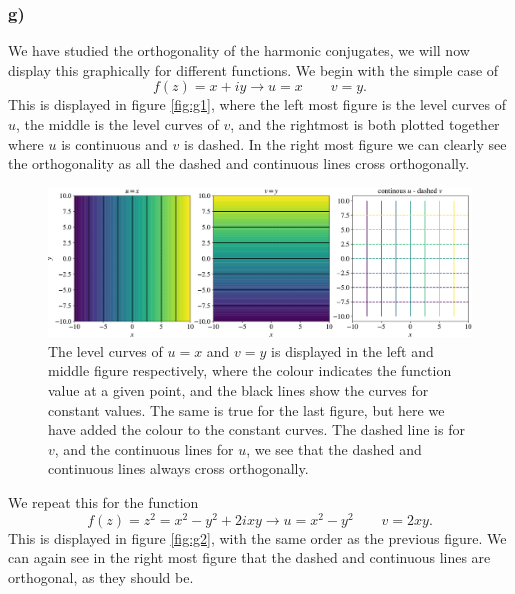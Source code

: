 \documentclass[12pt,twoside]{article}
\begin{document}
\subsubsection*{g)}
We have studied the orthogonality of the harmonic conjugates, we will now display this graphically for different functions. We begin with the simple case of
\begin{equation}
  f(z) = x+iy \rightarrow u=x\qquad v=y.
\end{equation}
This is displayed in figure \vref{fig:g1}, where the left most figure is the level curves of $u$, the middle is the level curves of $v$, and the rightmost is both plotted together where $u$ is continuous and $v$ is dashed. In the right most figure we can clearly see the orthogonality as all the dashed and continuous lines cross orthogonally. \par
\begin{figure}
  \centering
  \includegraphics[width=\textwidth]{../figures/first.pdf}
  \caption{The level curves of $u=x$ and $v=y$ is displayed in the left and middle figure respectively, where the colour indicates the function value at a given point, and the black lines show the curves for constant values. The same is true for the last figure, but here we have added the colour to the constant curves. The dashed line is for $v$, and the continuous lines for $u$, we see that the dashed and continuous lines always cross orthogonally.}
  \label{fig:g1}
\end{figure}
We repeat this for the function
\begin{equation}
  f(z) = z^2 = x^2-y^2+2ixy \rightarrow u=x^2-y^2\qquad v=2xy.
\end{equation}
This is displayed in figure \vref{fig:g2}, with the same order as the previous figure. We can again see in the right most figure that the dashed and continuous lines are orthogonal, as they should be.\par
\end{document}
